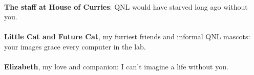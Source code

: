 \documentclass[12pt]{myucthesis}
\begin{document}
\begin{frontmatter}
\begin{acknowledgements}
\paragraph{}
\textbf{The staff at House of Curries}: QNL would have starved long ago without you.
\paragraph{}
\textbf{Little Cat and Future Cat}, my furriest friends and informal QNL mascots: your images grace every computer in the lab.
\paragraph{}
\textbf{Elizabeth}, my love and companion: I can't imagine a life without you.

\end{acknowledgements}
\end{frontmatter}











{}

\appendix

\end{document}

